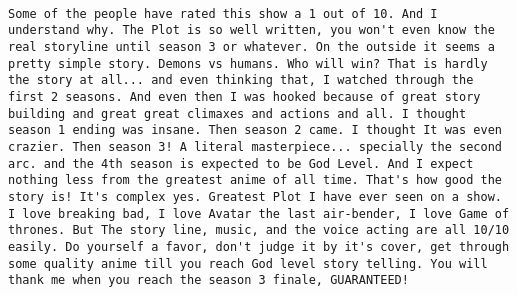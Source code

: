 \documentclass[
]{article}
\begin{document}
\begin{verbatim}
                                                                                                                                                                                                                                                                                                                                                                                                                                                                                                                                                                                                                                                                                                                                                                                                                                                                                                                                                                                                                                                                                                                                                                                                                                                                                                                                                                                                                                                                                                                                                                                                                                                                                                                                                                                                                                                                                                                                                                                                                                                                   Some of the people have rated this show a 1 out of 10. And I understand why. The Plot is so well written, you won't even know the real storyline until season 3 or whatever. On the outside it seems a pretty simple story. Demons vs humans. Who will win? That is hardly the story at all... and even thinking that, I watched through the first 2 seasons. And even then I was hooked because of great story building and great great climaxes and actions and all. I thought season 1 ending was insane. Then season 2 came. I thought It was even crazier. Then season 3! A literal masterpiece... specially the second arc. and the 4th season is expected to be God Level. And I expect nothing less from the greatest anime of all time. That's how good the story is! It's complex yes. Greatest Plot I have ever seen on a show. I love breaking bad, I love Avatar the last air-bender, I love Game of thrones. But The story line, music, and the voice acting are all 10/10 easily. Do yourself a favor, don't judge it by it's cover, get through some quality anime till you reach God level story telling. You will thank me when you reach the season 3 finale, GUARANTEED!

\end{verbatim}
\end{document}
